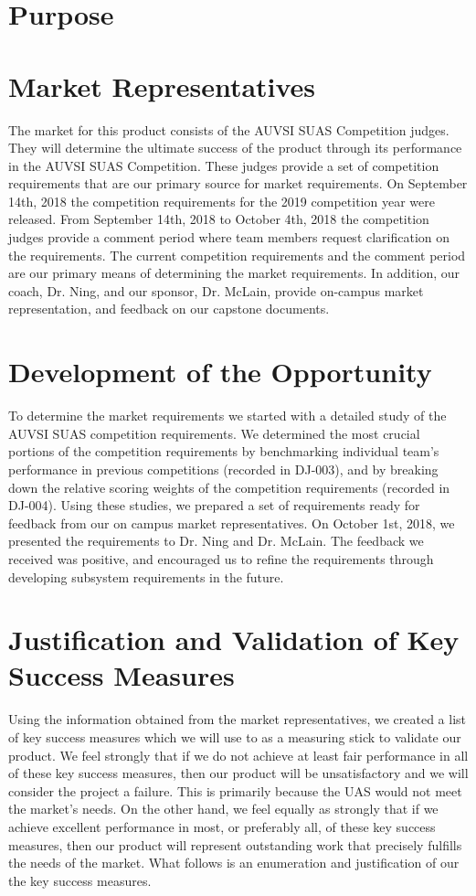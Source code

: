\documentclass[]{auvsi_doc}
\begin{document}
\CapstoneTitlePage

\section{Purpose}
\section{Market Representatives}
The market for this product consists of the AUVSI SUAS Competition judges.
They will determine the ultimate success of the product through its performance in the AUVSI SUAS Competition.
These judges provide a set of competition requirements that are our primary source for market requirements.
On September 14th, 2018 the competition requirements for the 2019 competition year were released.
From September 14th, 2018 to October 4th, 2018 the competition judges provide a comment period where team members request clarification on the requirements.
The current competition requirements and the comment period are our primary means of determining the market requirements.
In addition, our coach, Dr. Ning, and our sponsor, Dr. McLain, provide on-campus market representation, and feedback on our capstone documents. 

\section{Development of the Opportunity}

To determine the market requirements we started with a detailed study of the AUVSI SUAS competition requirements.
We determined the most crucial portions of the competition requirements by benchmarking individual team's performance in previous competitions (recorded in DJ-003), and by breaking down the relative scoring weights of the competition requirements (recorded in DJ-004). 
Using these studies, we prepared a set of requirements ready for feedback from our on campus market representatives.
On October 1st, 2018, we presented the requirements to Dr. Ning and Dr. McLain.
The feedback we received was positive, and encouraged us to refine the requirements through developing subsystem requirements in the future.

\section{Justification and Validation of Key Success Measures}
Using the information obtained from the market representatives, we created a list of key success measures which we will use to as a measuring stick to validate our product. We feel strongly that if we do not achieve at least fair performance in all of these key success measures, then our product will be unsatisfactory and we will consider the project a failure. This is primarily because the UAS would not meet the market's needs. On the other hand, we feel equally as strongly that if we achieve excellent performance in most, or preferably all, of these key success measures, then our product will represent outstanding work that precisely fulfills the needs of the market. What follows is an enumeration and justification of our the key success measures. 
\end{document}
